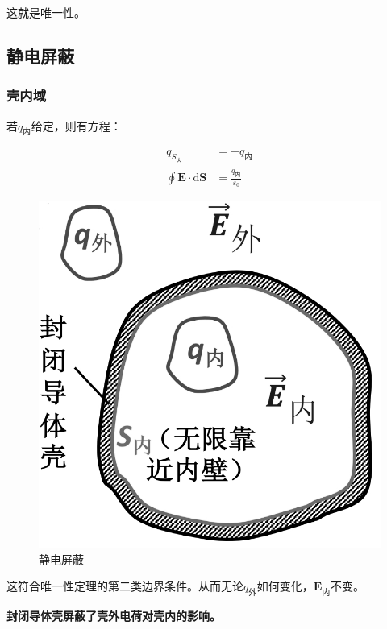 \documentclass[12pt,onecolumn,a4paper]{book}
\numberwithin{table}{subsection}
\numberwithin{equation}{subsection}
\begin{document}
这就是唯一性。

\subsection{静电屏蔽}

\subsubsection{壳内域}

若$q_\text{内}$给定，则有方程：

\begin{align}
    q_\text{$S_\text{内}$}                        & = -q_\text{内}                      \\
    \oint \mathbf{E} \cdot \mathrm{d} \mathbf{S} & = \frac{q_\text{内}}{\varepsilon_0}
\end{align}


\begin{figure}[ht]
    \centering
    \includegraphics[scale=0.2]{pic/2.2.3.png}
    \caption{静电屏蔽}
\end{figure}

这符合唯一性定理的第二类边界条件。从而无论$q_\text{外}$如何变化，$\mathbf{E}_\text{内}$不变。

\textbf{封闭导体壳屏蔽了壳外电荷对壳内的影响。}
\end{document}
